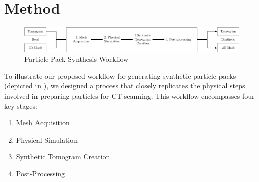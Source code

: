 \documentclass[preprint,12pt]{elsarticle}
\begin{document}
\section{Method}\label{sec:method}
\begin{figure}
    \includegraphics[width=\textwidth]{figures/pdf/synthesis-workflow.pdf}
    \caption{Particle Pack Synthesis Workflow}
    \label{fig:workflow}
\end{figure}
To illustrate our proposed workflow for generating synthetic particle packs (depicted in ), we designed a process that closely replicates the physical steps involved in preparing particles for CT scanning. This workflow encompasses four key stages:
\par
\begin{enumerate}
    \item Mesh Acquisition%
    \item Physical Simulation%
    \item Synthetic Tomogram Creation%
    \item Post-Processing%
\end{enumerate}
\end{document}
